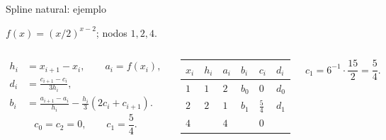 \documentclass[main.tex]{subfiles}
\begin{document}
\begin{frame}[t]{Spline natural: ejemplo}
\par\noindent\begin{minipage}[t][9mm][t]{\textwidth}\small\strut $f(x)=(x/2)^{x-2}$; nodos $1,2,4$.\end{minipage}\par\nointerlineskip
\begin{columns}[T]\scriptsize\begin{align*}
h_i&=x_{i+1}-x_i,\qquad a_i=f(x_i),\\
d_i&=\frac{c_{i+1}-c_i}{3h_i},\\
b_i&=\frac{a_{i+1}-a_i}{h_i}-\frac{h_i}{3}(2c_i+c_{i+1}).
\end{align*}\scriptsize\[c_0=c_2=0,\qquad c_1=\frac54.\]\begin{minipage}[t]{\textwidth}\begingroup\scriptsize\setlength{\tabcolsep}{2pt}\begin{center}\begin{tabular}{|C{.12\textwidth}|C{.12\textwidth}|C{.12\textwidth}|C{.12\textwidth}|C{.12\textwidth}|C{.12\textwidth}|}\hline
\rule[-2mm]{0pt}{6mm}$x_i$&$h_i$&$a_i$&$b_i$&$c_i$&$d_i$\\\hline
\rule[-2.5mm]{0pt}{7mm}$1$&$1$&$2$&$b_0$&$0$&$d_0$\\\hline
\rule[-2.5mm]{0pt}{7mm}$2$&$2$&$1$&$b_1$&$\frac{5}{4}$&$d_1$\\\hline
\rule[-2.5mm]{0pt}{7mm}$4$&&$4$&&$0$&\\\hline
\end{tabular}\end{center}\endgroup\end{minipage}\par
\scriptsize\[c_1=6^{-1}\cdot\frac{15}{2}=\frac54.\]\end{columns}
\end{frame}
\end{document}
